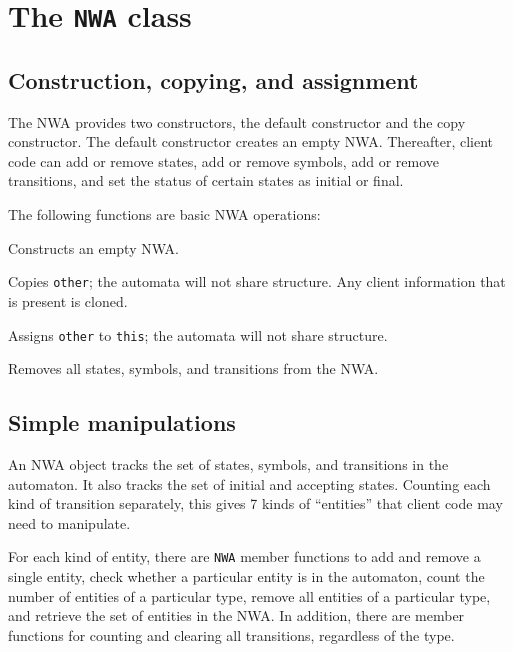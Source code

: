\section{The \texttt{NWA} class}
\label{Se:NWA-class}

\subsection{Construction, copying, and assignment}
\label{Se:Construction}

The NWA provides two constructors, the default constructor and the copy
constructor. The default constructor creates an empty NWA. Thereafter,
client code can add or remove states, add or remove symbols, add or remove
transitions, and set the status of certain states as initial or final.


The following functions are basic NWA operations:
\begin{functionlist}
    Constructs an empty NWA.

   Copies \texttt{other}; the
    automata will not share structure. Any client information that is present is cloned.

  \functionitem[\texttt{NWA::operator=(NWA const \& other)}] Assigns \texttt{other} to \texttt{this};
    the automata will not share structure.

   \nopagebreak
    Removes all states, symbols, and transitions from the NWA.

\end{functionlist}


\subsection{Simple manipulations}

An NWA object tracks the set of states, symbols, and transitions in the
automaton. It also tracks the set of initial and accepting states.
Counting each kind of transition separately, this gives 7 kinds of
``entities'' that client code may need to manipulate.

For each kind of entity, there are \texttt{NWA} member functions to add and
remove a single entity, check whether a particular entity is in the
automaton, count the number of entities of a particular type, remove all
entities of a particular type, and retrieve the set of entities in the
NWA. In addition, there are member functions for counting and clearing all
transitions, regardless of the type.

